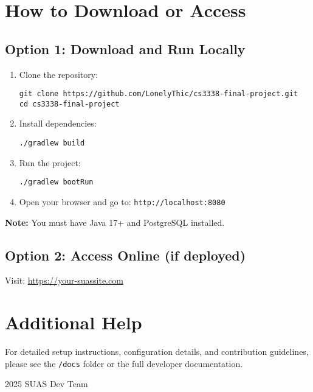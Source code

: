 \documentclass{article}
\begin{document}
\section{How to Download or Access}
\subsection*{Option 1: Download and Run Locally}
\begin{enumerate}
    \item Clone the repository:
    \begin{lstlisting}
git clone https://github.com/LonelyThic/cs3338-final-project.git
cd cs3338-final-project
    \end{lstlisting}

    \item Install dependencies:
    \begin{lstlisting}
./gradlew build
    \end{lstlisting}

    \item Run the project:
    \begin{lstlisting}
./gradlew bootRun
    \end{lstlisting}

    \item Open your browser and go to: \texttt{http://localhost:8080}
\end{enumerate}

\textbf{Note:} You must have Java 17+ and PostgreSQL installed.

\subsection*{Option 2: Access Online (if deployed)}
Visit: \href{https://your-suassite.com}{https://your-suassite.com}

\section{Additional Help}
For detailed setup instructions, configuration details, and contribution guidelines, please see the \texttt{/docs} folder or the full developer documentation.

\bigskip
\noindent
\textcopyright{}
2025 SUAS Dev Team
\end{document}
